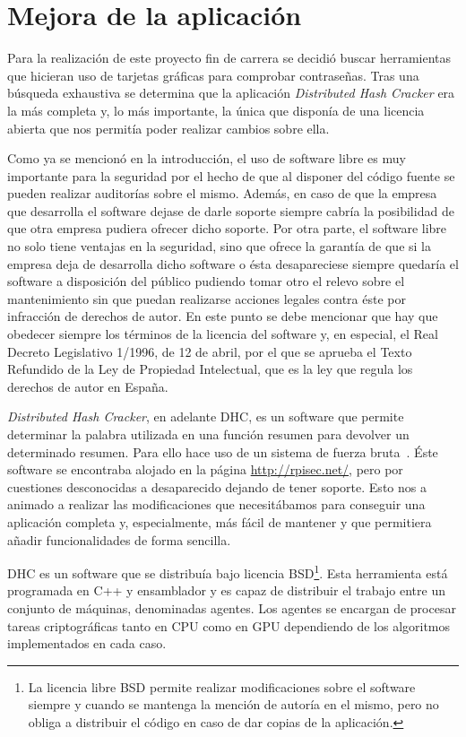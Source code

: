 \chapter{Mejora de la aplicación}\label{cap4}

Para la realización de este proyecto fin de carrera se decidió buscar herramientas que hicieran uso de tarjetas gráficas para comprobar contraseñas. Tras una búsqueda exhaustiva se determina que la aplicación \emph{Distributed Hash Cracker} era la más completa y, lo más importante, la única que disponía de una licencia abierta que nos permitía poder realizar cambios sobre ella.

Como ya se mencionó en la introducción, el uso de software libre es muy importante para la seguridad por el hecho de que al disponer del código fuente se pueden realizar auditorías sobre el mismo. Además, en caso de que la empresa que desarrolla el software dejase de darle soporte siempre cabría la posibilidad de que otra empresa pudiera ofrecer dicho soporte. Por otra parte, el software libre no solo tiene ventajas en la seguridad, sino que ofrece la garantía de que si la empresa deja de desarrolla dicho software o ésta desapareciese siempre quedaría el software a disposición del público pudiendo tomar otro el relevo sobre el mantenimiento sin que puedan realizarse acciones legales contra éste por infracción de derechos de autor. En este punto se debe mencionar que hay que obedecer siempre los términos de la licencia del software y, en especial, el Real Decreto Legislativo 1/1996, de 12 de abril, por el que se aprueba el Texto Refundido de la Ley de Propiedad Intelectual, que es la ley que regula los derechos de autor en España.

\emph{Distributed Hash Cracker}, en adelante DHC, es un software que permite determinar la palabra utilizada en una función resumen para devolver un determinado resumen. Para ello hace uso de un sistema de fuerza bruta~\cite{dhc:paper}. Éste software se encontraba alojado en la página \url{http://rpisec.net/}, pero por cuestiones desconocidas a desaparecido dejando de tener soporte. Esto nos a animado a realizar las modificaciones que necesitábamos para conseguir una aplicación completa y, especialmente, más fácil de mantener y que permitiera añadir funcionalidades de forma sencilla.

DHC es un software que se distribuía bajo licencia BSD\footnote{La licencia libre BSD permite realizar modificaciones sobre el software siempre y cuando se mantenga la mención de autoría en el mismo, pero no obliga a distribuir el código en caso de dar copias de la aplicación.}. Esta herramienta está programada en C++ y ensamblador y es capaz de distribuir el trabajo entre un conjunto de máquinas, denominadas agentes. Los agentes se encargan de procesar tareas criptográficas tanto en CPU como en GPU dependiendo de los algoritmos implementados en cada caso.

